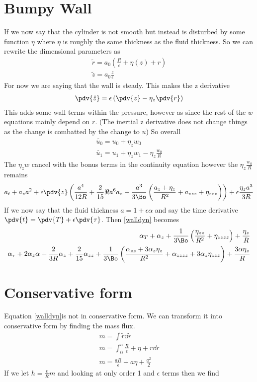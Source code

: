\documentclass[12pt]{article}
\begin{document}
\section{Bumpy Wall}

If we now say that the cylinder is not smooth but instead is disturbed by some function $\eta$ where $\eta$ is roughly the same thickness as the fluid thickness. So we can rewrite the dimensional parameters as
\begin{align}
\tilde r = a_0\left(\frac{R}{\epsilon}+\eta(z) +r\right)\\
\tilde z = a_0\frac{ z}{\epsilon}
\end{align}
For now we are saying that the wall is steady.
This makes the z derivative
\begin{align}
\pdv{\hat{z}} = \epsilon\left(\pdv{z} - \eta_z\pdv{r}\right)
\end{align}
This adds some wall terms within the pressure, however as since the rest of the $w$ equations mainly depend on $r$. (The inertial z derivative does not change things as the change is combatted by the change to $u$)
So overall
\begin{align}
\tilde{u_0} = u_0 + \eta_z w_0 \\
\tilde{u_1} = u_1 + \eta_z w_1 - \eta_z \frac{w_0}{R}
\end{align}
The $\eta_z w$ cancel with the bonus terms in the continuity equation however the $\eta_z \frac{w_0}{R}$ remains
\begin{align}
a_t + a_z a^2  +\epsilon\pdv{z}\left(\frac{a^4}{12R}+\frac{2}{15}\Re a^6a_z+ \frac{a^3}{3\Bo}\left(\frac{a_z+\eta_z}{R^2}+a_{zzz}+\eta_{zzz}\right)\right) + \epsilon\frac{\eta_z a^3}{3R}\label{walldyn}
\end{align}
If we now say that the fluid thickness $a = 1+\epsilon\alpha$ and say the time derivative $\pdv{t} = \pdv{T} + \epsilon\pdv{\tau}$. Then \eqref{walldyn} becomes
\begin{align}
\alpha_T + \alpha_z+ \frac{1}{3\Bo}\left(\frac{\eta_{zz}}{R^2}+ \eta_{zzzz}\right)+ \frac{\eta_z}{R}\\
	\alpha_\tau + 2\alpha_z\alpha+ \frac{2}{3R}\alpha_z + \frac{2}{15}\alpha_{zz}+ \frac{1}{3\Bo}\left(\frac{\alpha_{zz}+ 3\alpha_z\eta_z}{R^2}+\alpha_{zzzz}+3\alpha_z\eta_{zzz} \right)+ \frac{3\alpha\eta_z}{R}
\end{align}

\section{Conservative form}
Equation \eqref{walldyn}is not in conservative form. We can transform it into conservative form by finding the mass flux.
\begin{align}
m = \int \tilde{r}\dd{\tilde{r}}\\
m = \int_{0}^{a}{\frac{R}{\epsilon}+\eta+r\dd{r}}\\
m = \frac{a R}{\epsilon} + a\eta+ \frac{a^2}{2}
\end{align}
If we let $h = \frac{\epsilon}{R}m$ and looking at only order 1 and $\epsilon$ terms then we find
\end{document}
